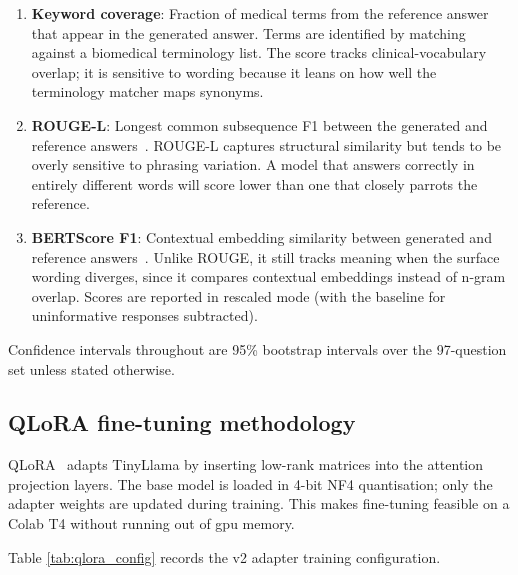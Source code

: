\begin{enumerate}
    \item \textbf{Keyword coverage}: Fraction of medical terms from the reference answer that appear in the generated answer. Terms are identified by matching against a biomedical terminology list. The score tracks clinical-vocabulary overlap; it is sensitive to wording because it leans on how well the terminology matcher maps synonyms.
    \item \textbf{ROUGE-L}: Longest common subsequence F1 between the generated and reference answers~\cite{lin2004rouge}. ROUGE-L captures structural similarity but tends to be overly sensitive to phrasing variation. A model that answers correctly in entirely different words will score lower than one that closely parrots the reference.
    \item \textbf{BERTScore F1}: Contextual embedding similarity between generated and reference answers~\cite{zhang2019bertscore}. Unlike ROUGE, it still tracks meaning when the surface wording diverges, since it compares contextual embeddings instead of n-gram overlap. Scores are reported in rescaled mode (with the baseline for uninformative responses subtracted).
\end{enumerate}

Confidence intervals throughout are 95\% bootstrap intervals over the 97-question set unless stated otherwise.

\subsection{QLoRA fine-tuning methodology}

QLoRA~\cite{dettmers2023qlora} adapts TinyLlama by inserting low-rank matrices into the attention projection layers. The base model is loaded in 4-bit NF4 quantisation; only the adapter weights are updated during training. This makes fine-tuning feasible on a Colab T4 without running out of \ac{gpu} memory.

Table \ref{tab:qlora_config} records the v2 adapter training configuration.

